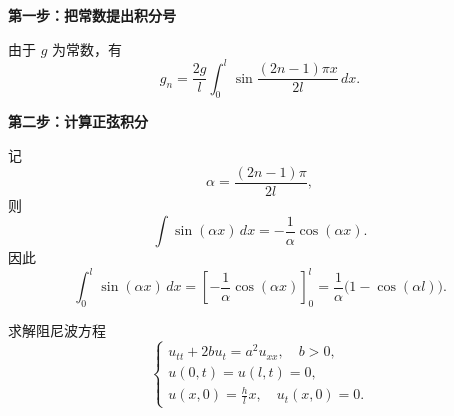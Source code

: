 \begin{dxtips}[能把公式都写上就是胜利]
    \noindent\textbf{第一步：把常数提出积分号}

由于 $g$ 为常数，有
\[
g_n=\frac{2g}{l}\int_0^l \sin\frac{(2n-1)\pi x}{2l}\,dx.
\]

\noindent\textbf{第二步：计算正弦积分}

记
\[
\alpha=\frac{(2n-1)\pi}{2l},
\]
则
\[
\int \sin(\alpha x)\,dx
=
-\frac{1}{\alpha}\cos(\alpha x).
\]
因此
\[
\int_0^l \sin(\alpha x)\,dx
=
\left[-\frac{1}{\alpha}\cos(\alpha x)\right]_0^l
=
\frac{1}{\alpha}\bigl(1-\cos(\alpha l)\bigr).
\]
\end{dxtips}
\begin{homework}
[6] 求解阻尼波方程
\[
\begin{cases}
u_{tt}+2bu_t=a^{2}u_{xx},\quad b>0,\\[3pt]
u(0,t)=u(l,t)=0,\\[3pt]
u(x,0)=\frac{h}{l}x,\quad u_t(x,0)=0.
\end{cases}
\]
\end{homework}
